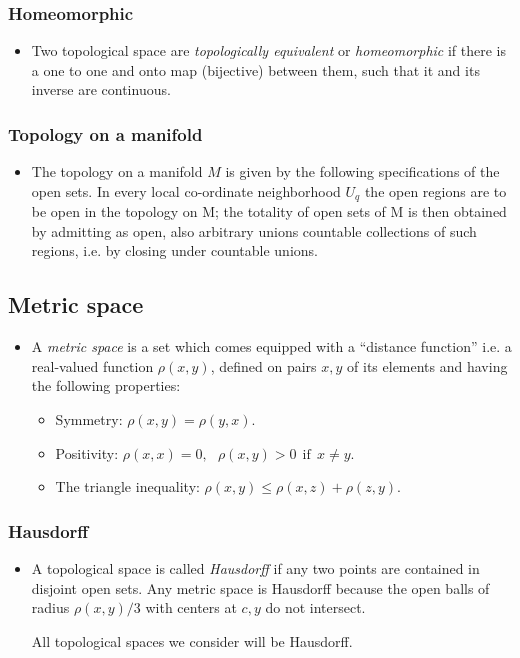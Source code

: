 \documentclass[11pt]{article}
\numberwithin{equation}{section}
\begin{document}
\subsubsection{Homeomorphic}
\begin{itemize}
  \item Two topological space are \emph{topologically equivalent} or \emph{homeomorphic} if there is a one to one and onto map (bijective) between them, such that it and its inverse are continuous. 
\end{itemize}
\subsubsection{Topology on a manifold}
\begin{itemize}
  \item The topology on a manifold $M$ is given by the following specifications of the open sets. In every local co-ordinate neighborhood $U_q$ the open regions are to be open in the topology on M; the totality of open sets of M is then obtained by admitting as open, also arbitrary unions countable collections of such regions, i.e. by closing under countable unions. 
\end{itemize}
\subsection{Metric space}
\begin{itemize}
  \item A \emph{metric space} is a set which comes equipped with a ``distance function'' i.e. a real-valued function $\rho(x,y)$, defined on pairs $x, y$ of its elements and having the following properties:
  \begin{itemize}
    \item Symmetry: $\rho(x,y) = \rho(y,x)$.
    \item Positivity: $\rho(x,x) =0, ~~~ \rho(x,y) > 0 ~~\text{if}~~ x \neq y$. 
    \item The triangle inequality: $\rho(x,y) \leq \rho(x,z)+\rho(z,y)$.
  \end{itemize}
\end{itemize}
\subsubsection{Hausdorff}
\begin{itemize}
  \item A topological space is called \emph{Hausdorff} if any two points are contained in disjoint open sets. Any metric space is Hausdorff because the open balls of radius $\rho(x,y)/3$ with centers at $c,y$ do not intersect.   

  All topological spaces we consider will be Hausdorff. 
\end{itemize}
\end{document}
